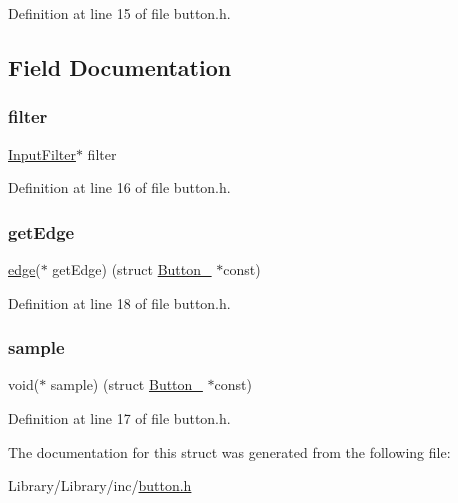 Definition at line 15 of file button.\+h.



\subsection{Field Documentation}
\mbox{\label{struct_button___a9568e563650fcb16283e6df6008722e9}} 
\subsubsection{\texorpdfstring{filter}{filter}}
{\footnotesize\ttfamily \mbox{\hyperlink{button_8h_aa0f38bbf6320aea7cc99c3a77ed46d80}{Input\+Filter}}$\ast$ filter}



Definition at line 16 of file button.\+h.

\mbox{\label{struct_button___a164ee133b5e4233ebd6a6849f806f551}} 
\subsubsection{\texorpdfstring{get\+Edge}{getEdge}}
{\footnotesize\ttfamily \mbox{\hyperlink{button_8h_a4ef43ff5c6d42dacbc8ffd9c8cfdc189}{edge}}($\ast$ get\+Edge) (struct \mbox{\hyperlink{struct_button__}{Button\+\_\+}} $\ast$const)}



Definition at line 18 of file button.\+h.

\mbox{\label{struct_button___a54894037c0b758948b3d4d4ac39c2c0c}} 
\subsubsection{\texorpdfstring{sample}{sample}}
{\footnotesize\ttfamily void($\ast$ sample) (struct \mbox{\hyperlink{struct_button__}{Button\+\_\+}} $\ast$const)}



Definition at line 17 of file button.\+h.



The documentation for this struct was generated from the following file\+:\begin{DoxyCompactItemize}
\item 
Library/\+Library/inc/\mbox{\hyperlink{button_8h}{button.\+h}}\end{DoxyCompactItemize}
